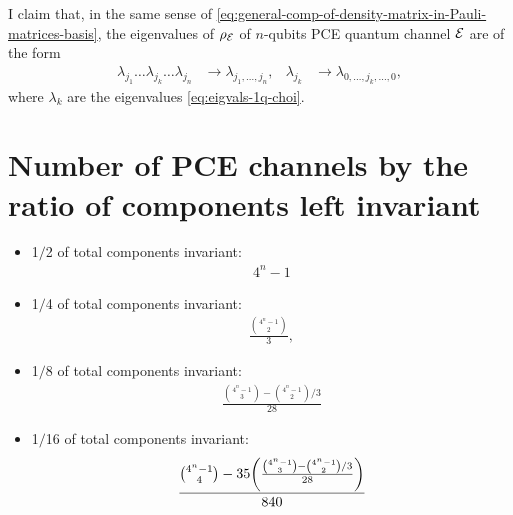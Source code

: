 I claim that, in the same sense of 
\eqref{eq:general-comp-of-density-matrix-in-Pauli-matrices-basis},
the eigenvalues of $\rho_{\mathcal{E}}$ of $n$-qubits PCE quantum channel
$\mathcal{E}$ are of the form
\begin{align}
\lambda_{j_1}\ldots \lambda_{j_k}\ldots \lambda_{j_n}
&\to\lambda_{j_1,\ldots,j_n}, &
\lambda_{j_k}&\to\lambda_{0,\ldots,j_k,\ldots,0},
\end{align}
where $\lambda_k$ are the eigenvalues \eqref{eq:eigvals-1q-choi}.

\section{Number of PCE channels by the ratio of components 
left invariant}
\begin{itemize}
\item 1$/$2 of total components invariant:
\begin{align}
4^n-1
\end{align}

\item 1$/$4 of total components invariant:
\begin{align}
\frac{\binom{4^n-1}{2}}{3},
\end{align}

\item 1$/$8 of total components invariant:
\begin{align}
\frac{\binom{4^n-1}{3}-\binom{4^n-1}{2}/3}{28}
\end{align}

\item 1$/$16 of total components invariant:
\begin{align}
\frac{\binom{4^n-1}{4}-35\qty(\frac{\binom{4^n-1}{3}-\binom{4^n-1}{2}/3}{28})}{840}
\end{align}
\end{itemize}

